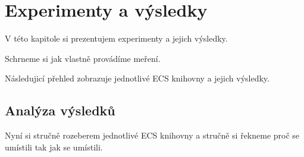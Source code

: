 \chapter{Experimenty a výsledky}
V této kapitole si prezentujem experimenty a jejich výsledky.

Schrneme si jak vlastně provádíme meření.

Následujicí přehled zobrazuje jednotlivé ECS knihovny a jejich výsledky.

\section{Analýza výsledků}
Nyní si stručně rozeberem jednotlivé ECS knihovny a stručně si řekneme proč se umístili tak jak se umístili.

